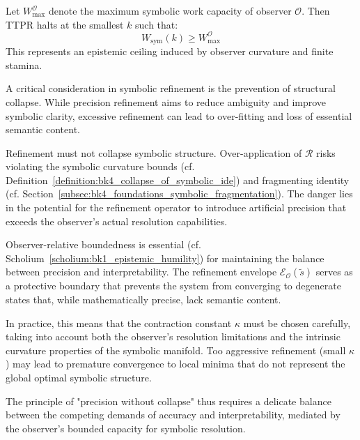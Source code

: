 \begin{remark}
\label{remark:bk4_symbolic_work_capacity}
Let \( W_{\max}^{\mathcal{O}} \) denote the maximum symbolic work capacity of observer \( \mathcal{O} \). Then TTPR halts at the smallest \( k \) such that:
\[
W_{\text{sym}}(k) \geq W_{\max}^{\mathcal{O}}
\]
This represents an epistemic ceiling induced by observer curvature and finite stamina.
\end{remark}


\begin{scholium}
\label{scholium:bk4_precision_without_collapse}
A critical consideration in symbolic refinement is the prevention of structural collapse. While precision refinement aims to reduce ambiguity and improve symbolic clarity, excessive refinement can lead to over-fitting and loss of essential semantic content.

Refinement must not collapse symbolic structure. Over-application of $\mathcal{R}$ risks violating the symbolic curvature bounds (cf. Definition~\ref{definition:bk4_collapse_of_symbolic_ide}) and fragmenting identity (cf. Section~\ref{subsec:bk4_foundations_symbolic_fragmentation}). The danger lies in the potential for the refinement operator to introduce artificial precision that exceeds the observer's actual resolution capabilities.

Observer-relative boundedness is essential (cf. Scholium~\ref{scholium:bk1_epistemic_humility}) for maintaining the balance between precision and interpretability. The refinement envelope $\mathcal{E}_{\mathcal{O}}(\tilde{s})$ serves as a protective boundary that prevents the system from converging to degenerate states that, while mathematically precise, lack semantic content.

In practice, this means that the contraction constant $\kappa$ must be chosen carefully, taking into account both the observer's resolution limitations and the intrinsic curvature properties of the symbolic manifold. Too aggressive refinement (small $\kappa$) may lead to premature convergence to local minima that do not represent the global optimal symbolic structure.

The principle of "precision without collapse" thus requires a delicate balance between the competing demands of accuracy and interpretability, mediated by the observer's bounded capacity for symbolic resolution.
\end{scholium}

